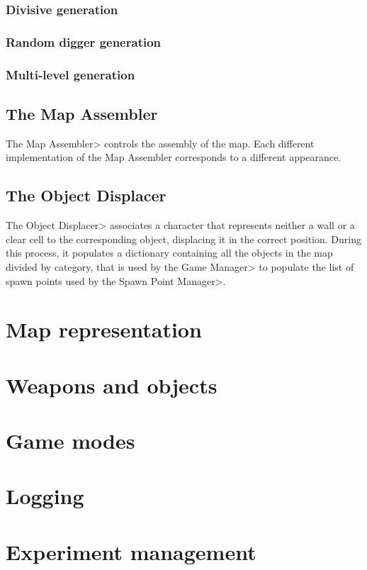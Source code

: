 \subsubsection{Divisive generation}

\subsubsection{Random digger generation}

\subsubsection{Multi-level generation}

\subsection{The Map Assembler}

The \<Map Assembler> controls the assembly of the map. Each different implementation of the Map Assembler corresponds to a different appearance.

\subsection{The Object Displacer}

The \<Object Displacer> associates a character that represents neither a wall or a clear cell to the corresponding object, displacing it in the correct position. During this process, it populates a dictionary containing all the objects in the map divided by category, that is used by the \<Game Manager> to populate the list of spawn points used by the \<Spawn Point Manager>.


\section{Map representation}


\section{Weapons and objects}


\section{Game modes}


\section{Logging}


\section{Experiment management}
